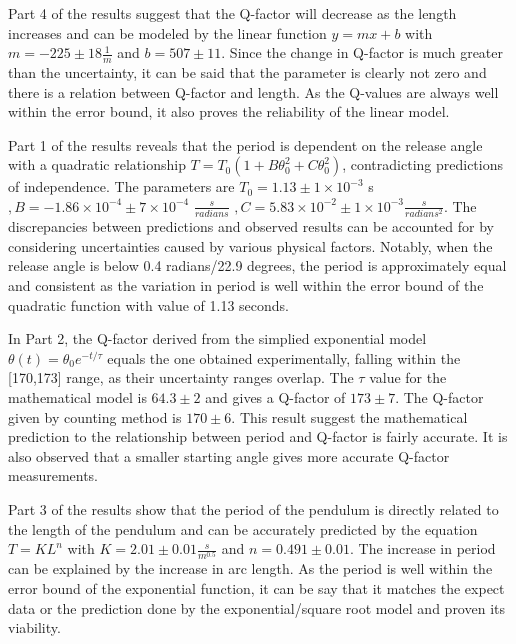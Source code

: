 \documentclass{article}
\begin{document}
Part 4 of the results suggest that the Q-factor will decrease as the length increases and can be modeled by the linear function $y = mx + b$ with $m = -225 \pm 18\frac{1}{m}$ and $b = 507 \pm 11$. Since the change in Q-factor is much greater than the uncertainty, it can be said that the parameter is clearly not zero and there is a relation between Q-factor and length. As the Q-values are always well within the error bound, it also proves the reliability of the linear model.

Part 1 of the results reveals that the period is dependent on the release angle with a quadratic relationship $T = T_0(1 + B\theta_0^2 + C\theta_0^2)$, contradicting predictions of independence. The parameters are $T_0 = 1.13  \pm 1\times10^{-3} $ s $, B = -1.86\times10^{-4}  \pm 7\times10^{-4}$ $\frac{s}{radians}$ $, C = 5.83\times10^{-2} \pm 1\times10^{-3} \frac{s}{radians^2}$. The discrepancies between predictions and observed results can be accounted for by considering uncertainties caused by various physical factors. Notably, when the release angle is below 0.4 radians/22.9 degrees, the period is approximately equal and consistent as the variation in period is well within the error bound of the quadratic function with value of 1.13 seconds.

In Part 2, the Q-factor derived from the simplied exponential model $\theta(t) = \theta_0 e^{-t/\tau}$ equals the one obtained experimentally, falling within the [170,173] range, as their uncertainty ranges overlap. The $\tau$ value for the mathematical model  is $64.3 \pm 2$ and gives a Q-factor of $173 \pm 7$. The Q-factor given by counting method is $170 \pm 6$. This result suggest the mathematical prediction to the relationship between period and Q-factor is fairly accurate. It is also observed that a smaller starting angle gives more accurate Q-factor measurements.

Part 3 of the results show that the period of the pendulum is directly related to the length of the pendulum and can be accurately predicted by the equation $T = KL^n$ with $K = 2.01 \pm 0.01\frac{s}{m^{0.5}}$ and $n = 0.491 \pm 0.01$. The increase in period can be explained by the increase in arc length. As the period is well within the error bound of the exponential function, it can be say that it matches the expect data or the prediction done by the exponential/square root model and proven its viability. 
\end{document}
